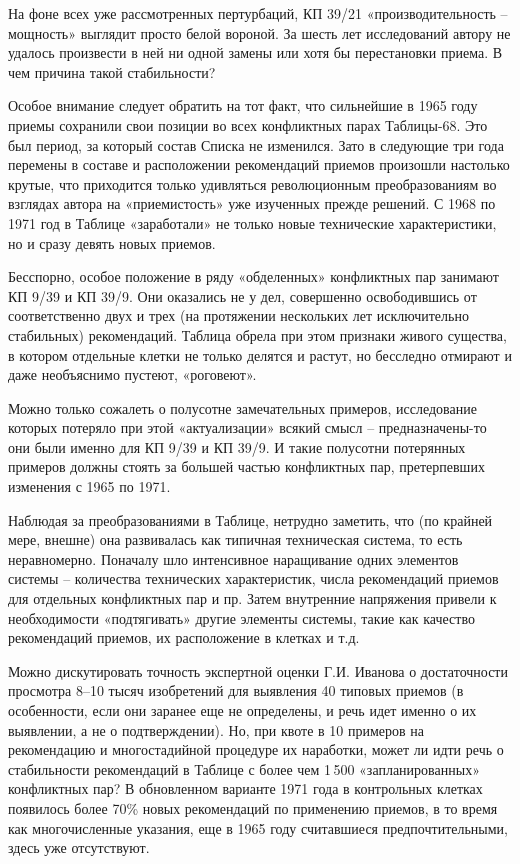 \documentclass[11pt,a4paper]{article}
\begin{document}
На фоне всех уже рассмотренных пертурбаций, КП 39/21 «производительность --
мощность» выглядит просто белой вороной. За шесть лет исследований автору не
удалось произвести в ней ни одной замены или хотя бы перестановки приема. В
чем причина такой стабильности?

Особое внимание следует обратить на тот факт, что сильнейшие в 1965 году
приемы сохранили свои позиции во всех конфликтных парах Таблицы-68. Это был
период, за который состав Списка не изменился. Зато в следующие три года
перемены в составе и расположении рекомендаций приемов произошли настолько
крутые, что приходится только удивляться революционным преобразованиям во
взглядах автора на «приемистость» уже изученных прежде решений. С 1968 по 1971
год в Таблице «заработали» не только новые технические характеристики, но и
сразу девять новых приемов.

Бесспорно, особое положение в ряду «обделенных» конфликтных пар занимают КП
9/39 и КП 39/9. Они оказались не у дел, совершенно освободившись от
соответственно двух и трех (на протяжении нескольких лет исключительно
стабильных) рекомендаций. Таблица обрела при этом признаки живого существа, в
котором отдельные клетки не только делятся и растут, но бесследно отмирают и
даже необъяснимо пустеют, «роговеют».

Можно только сожалеть о полусотне замечательных примеров, исследование которых
потеряло при этой «актуализации» всякий смысл -- предназначены-то они были
именно для КП 9/39 и КП 39/9. И такие полусотни потерянных примеров должны
стоять за большей частью конфликтных пар, претерпевших изменения с 1965 по
1971.

Наблюдая за преобразованиями в Таблице, нетрудно заметить, что (по крайней
мере, внешне) она развивалась как типичная техническая система, то есть
неравномерно. Поначалу шло интенсивное наращивание одних элементов системы --
количества технических характеристик, числа рекомендаций приемов для отдельных
конфликтных пар и пр. Затем внутренние напряжения привели к необходимости
«подтягивать» другие элементы системы, такие как качество рекомендаций
приемов, их расположение в клетках и т.д.

Можно дискутировать точность экспертной оценки Г.И. Иванова о достаточности
просмотра 8--10 тысяч изобретений для выявления 40 типовых приемов (в
особенности, если они заранее еще не определены, и речь идет именно о их
выявлении, а не о подтверждении). Но, при квоте в 10 примеров на рекомендацию
и многостадийной процедуре их наработки, может ли идти речь о стабильности
рекомендаций в Таблице с более чем 1\,500 «запланированных» конфликтных пар? В
обновленном варианте 1971 года в контрольных клетках появилось более 70\%
новых рекомендаций по применению приемов, в то время как многочисленные
указания, еще в 1965 году считавшиеся предпочтительными, здесь уже
отсутствуют.
\end{document}
